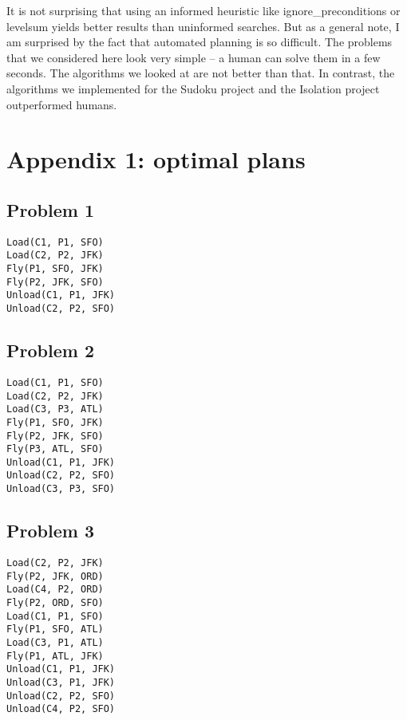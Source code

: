 \documentclass[11pt]{scrartcl}
\begin{document}
    It is not surprising that using an informed heuristic like
ignore\_preconditions or levelsum yields better results than uninformed
searches. But as a general note, I am surprised by the fact that
automated planning is so difficult. The problems that we considered here
look very simple -- a human can solve them in a few seconds. The
algorithms we looked at are not better than that. In contrast, the
algorithms we implemented for the Sudoku project and the Isolation
project outperformed humans.

\section*{Appendix 1: optimal plans}\label{appendix-1-optimal-plans}

\subsection*{Problem 1}\label{problem-1}
\begin{verbatim}
Load(C1, P1, SFO)
Load(C2, P2, JFK)
Fly(P1, SFO, JFK)
Fly(P2, JFK, SFO)
Unload(C1, P1, JFK)
Unload(C2, P2, SFO)
\end{verbatim}
\subsection*{Problem 2}\label{problem-2}
\begin{verbatim}
Load(C1, P1, SFO)
Load(C2, P2, JFK)
Load(C3, P3, ATL)
Fly(P1, SFO, JFK)
Fly(P2, JFK, SFO)
Fly(P3, ATL, SFO)
Unload(C1, P1, JFK)
Unload(C2, P2, SFO)
Unload(C3, P3, SFO)
\end{verbatim}
\subsection*{Problem 3}\label{problem-3}
\begin{verbatim}
Load(C2, P2, JFK)
Fly(P2, JFK, ORD)
Load(C4, P2, ORD)
Fly(P2, ORD, SFO)
Load(C1, P1, SFO)
Fly(P1, SFO, ATL)
Load(C3, P1, ATL)
Fly(P1, ATL, JFK)
Unload(C1, P1, JFK)
Unload(C3, P1, JFK)
Unload(C2, P2, SFO)
Unload(C4, P2, SFO)
\end{verbatim}
\end{document}
